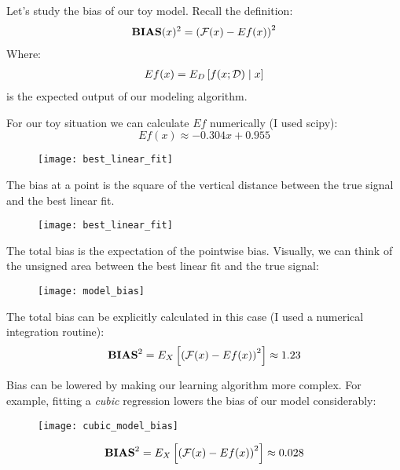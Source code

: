 %
%
\begin{frame}
  Let's study the bias of our toy model.  Recall the definition:
  \begin{align*}
    \operatorname*{\mathbf{BIAS}} (x)^2 = \left( \operatorname*{\mathcal{F}}(x) - Ef(x) \right)^2
  \end{align*}
  Where:
  \begin{align*}
    Ef(x) = E_D \left[ f(x; \operatorname*{\mathcal{D}}) \mid x \right] \\ 
  \end{align*}
  is the expected output of our modeling algorithm.
\end{frame}
%
%
\begin{frame}
  For our toy situation we can calculate $Ef$ numerically (I used scipy):
  $$ Ef(x) \approx -0.304 x +  0.955 $$
\end{frame}
%
%
\begin{frame}
  \begin{figure}
    \texttt{[image: best\_linear\_fit]}
  \end{figure}
\end{frame}
%
%
\begin{frame}
  The bias at a point is the square of the vertical distance between the true
  signal and the best linear fit.
  \begin{figure}
    \texttt{[image: best\_linear\_fit]}
  \end{figure}
\end{frame}
%
%
\begin{frame}
  The total bias is the expectation of the pointwise bias.  Visually, we can
  think of the unsigned area between the best linear fit and the true signal:
  \begin{figure}
    \texttt{[image: model\_bias]}
  \end{figure}
\end{frame}
%
%
\begin{frame}
  The total bias can be explicitly calculated in this case (I used a numerical
  integration routine):
  $$ {\operatorname*{\mathbf{BIAS}}}^2 = E_X \left[ \left( \operatorname*{\mathcal{F}}(x) - Ef(x) \right)^2 \right] \approx 1.23
  $$
\end{frame}
%
%
\begin{frame}
  Bias can be lowered by making our learning algorithm more complex.  For
  example, fitting a \textit{cubic} regression lowers the bias of our model
  considerably:
  \begin{figure}
    \texttt{[image: cubic\_model\_bias]}
  \end{figure}
  $$ {\operatorname*{\mathbf{BIAS}}}^2 = E_X \left[ \left( \operatorname*{\mathcal{F}}(x) - Ef(x) \right)^2 \right] \approx 0.028
  $$
\end{frame}
